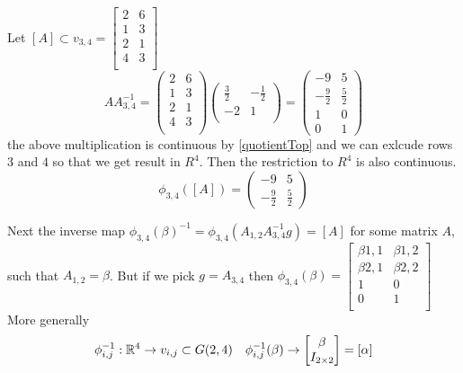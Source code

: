 \documentclass[11pt,a4paper]{report}
\begin{document}
\begin{Ex} \label{ex1}
    Let $[A] \subset v_{3,4} = \begin{bmatrix}
        2 & 6 \\
        1 & 3 \\
        2 & 1 \\
        4 & 3 \\
    \end{bmatrix}$
    $$ A A_{3,4}^{-1} =  \begin{pmatrix} 2 & 6 \\ 1 & 3 \\ 2 & 1 \\ 4 & 3 \\ \end{pmatrix} \begin{pmatrix} \frac{3}{2} & -\frac{1}{2} \\ -2 & 1 \\ \end{pmatrix}
    = \begin{pmatrix} -9 & 5 \\ -\frac{9}{2} & \frac{5}{2} \\ 1 & 0 \\ 0 & 1 \end{pmatrix}
    $$
    the above multiplication is continuous by \ref{quotientTop} and we can exlcude rows $3$ and $4$ so that we get result in $R^4$.
    Then the restriction to $R^4$ is also continuous.
    $$ \phi_{3,4}([A]) = \begin{pmatrix} -9 & 5 \\ -\frac{9}{2} & \frac{5}{2} \end{pmatrix} $$
\end{Ex}
Next the inverse map  $\phi_{3,4}(\beta)^{-1} = \phi_{3,4}(A_{1,2} A_{3,4}^{-1} g) = [A] $ for some matrix $A$, such that $A_{1,2} = \beta$.
But if we pick $g = A_{3,4}$ then 
$ \phi_{3,4}(\beta) =
\begin{bmatrix}
    \beta{1,1} & \beta{1,2} \\ 
    \beta{2,1} & \beta{2,2} \\
    1 & 0 \\ 
    0 & 1 \\
\end{bmatrix}
$
More generally
$$\phi_{i,j}^{-1} : \mathbb{R}^4 \to v_{i,j} \subset G(2,4) \quad \phi_{i,j}^{-1}(\beta) \to 
\begin{bmatrix}
    \beta \\
    I_{2 \times 2}
\end{bmatrix} = [\alpha]
$$
\end{document}
